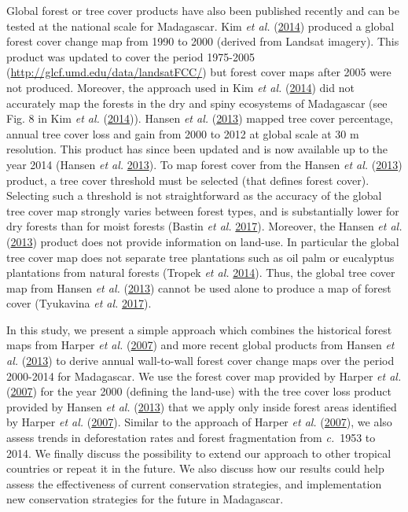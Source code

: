 \documentclass[]{article}
\theoremstyle{definition}
\theoremstyle{definition}
\theoremstyle{definition}
\theoremstyle{remark}
\begin{document}
Global forest or tree cover products have also been published recently
and can be tested at the national scale for Madagascar. Kim \emph{et
al.} (\protect\hyperlink{ref-Kim2014}{2014}) produced a global forest
cover change map from 1990 to 2000 (derived from Landsat imagery). This
product was updated to cover the period 1975-2005
(\url{http://glcf.umd.edu/data/landsatFCC/}) but forest cover maps after
2005 were not produced. Moreover, the approach used in Kim \emph{et al.}
(\protect\hyperlink{ref-Kim2014}{2014}) did not accurately map the
forests in the dry and spiny ecosystems of Madagascar (see Fig. 8 in Kim
\emph{et al.} (\protect\hyperlink{ref-Kim2014}{2014})). Hansen \emph{et
al.} (\protect\hyperlink{ref-Hansen2013}{2013}) mapped tree cover
percentage, annual tree cover loss and gain from 2000 to 2012 at global
scale at 30 m resolution. This product has since been updated and is now
available up to the year 2014 (Hansen \emph{et al.}
\protect\hyperlink{ref-Hansen2013}{2013}). To map forest cover from the
Hansen \emph{et al.} (\protect\hyperlink{ref-Hansen2013}{2013}) product,
a tree cover threshold must be selected (that defines forest cover).
Selecting such a threshold is not straightforward as the accuracy of the
global tree cover map strongly varies between forest types, and is
substantially lower for dry forests than for moist forests (Bastin
\emph{et al.} \protect\hyperlink{ref-Bastin2017}{2017}). Moreover, the
Hansen \emph{et al.} (\protect\hyperlink{ref-Hansen2013}{2013}) product
does not provide information on land-use. In particular the global tree
cover map does not separate tree plantations such as oil palm or
eucalyptus plantations from natural forests (Tropek \emph{et al.}
\protect\hyperlink{ref-Tropek2014}{2014}). Thus, the global tree cover
map from Hansen \emph{et al.} (\protect\hyperlink{ref-Hansen2013}{2013})
cannot be used alone to produce a map of forest cover (Tyukavina
\emph{et al.} \protect\hyperlink{ref-Tyukavina2017}{2017}).

In this study, we present a simple approach which combines the
historical forest maps from Harper \emph{et al.}
(\protect\hyperlink{ref-Harper2007}{2007}) and more recent global
products from Hansen \emph{et al.}
(\protect\hyperlink{ref-Hansen2013}{2013}) to derive annual wall-to-wall
forest cover change maps over the period 2000-2014 for Madagascar. We
use the forest cover map provided by Harper \emph{et al.}
(\protect\hyperlink{ref-Harper2007}{2007}) for the year 2000 (defining
the land-use) with the tree cover loss product provided by Hansen
\emph{et al.} (\protect\hyperlink{ref-Hansen2013}{2013}) that we apply
only inside forest areas identified by Harper \emph{et al.}
(\protect\hyperlink{ref-Harper2007}{2007}). Similar to the approach of
Harper \emph{et al.} (\protect\hyperlink{ref-Harper2007}{2007}), we also
assess trends in deforestation rates and forest fragmentation from
\emph{c.}~1953 to 2014. We finally discuss the possibility to extend our
approach to other tropical countries or repeat it in the future. We also
discuss how our results could help assess the effectiveness of current
conservation strategies, and implementation new conservation strategies
for the future in Madagascar.
\end{document}
